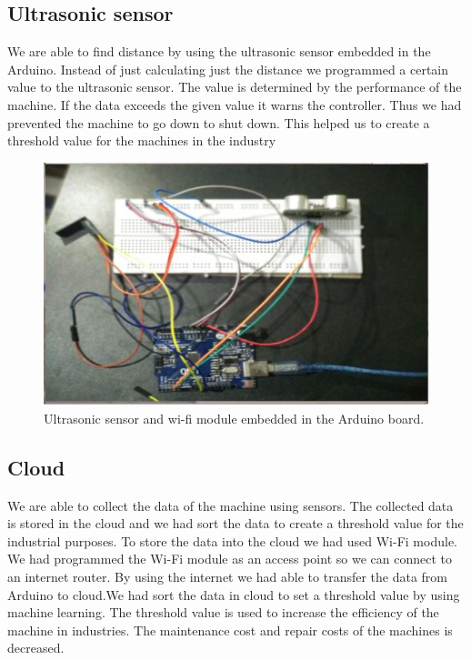 \subsection{Ultrasonic sensor}
We are able to find distance by using the ultrasonic sensor embedded in the Arduino. Instead of just calculating just the distance we programmed a certain value to the ultrasonic sensor. The value is determined by the performance of the machine. If the data exceeds the given value it warns the controller. Thus we had prevented the machine to go down to shut down. This helped us to create a threshold value for the machines in the industry

\begin{figure}[h]
\centerline{\includegraphics[width=5.7in]{first}}
\caption{Ultrasonic sensor and wi-fi module embedded in the Arduino board.}
\end{figure}
\newpage
\subsection{Cloud}
We are able to collect the data of the machine using sensors. The collected data is stored in the cloud and we had sort the data to create a threshold value for the industrial purposes. To store the data into the cloud we had used Wi-Fi module. 
We had programmed the Wi-Fi module as an access point so we can connect to an internet router. By using the internet we had able to transfer the data from Arduino to cloud.We had sort the data in cloud to set a threshold value by using machine learning. The threshold value is used to increase the efficiency of the machine in industries. The maintenance cost and repair costs of the machines is decreased.

